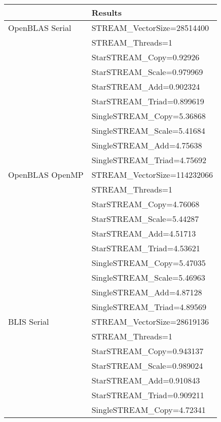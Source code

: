 \begin{table}[H]
\begin{center}
\begin{tabular}{ |l|l| } 
\hline
                & Results \\ 
\hline
OpenBLAS Serial & STREAM\_VectorSize=28514400 \\
                & STREAM\_Threads=1 \\
                & StarSTREAM\_Copy=0.92926 \\
                & StarSTREAM\_Scale=0.979969 \\
                & StarSTREAM\_Add=0.902324 \\
                & StarSTREAM\_Triad=0.899619 \\
                & SingleSTREAM\_Copy=5.36868 \\
                & SingleSTREAM\_Scale=5.41684 \\
                & SingleSTREAM\_Add=4.75638 \\
                & SingleSTREAM\_Triad=4.75692 \\
\hline
OpenBLAS OpenMP & STREAM\_VectorSize=114232066 \\
                & STREAM\_Threads=1 \\
                & StarSTREAM\_Copy=4.76068 \\
                & StarSTREAM\_Scale=5.44287 \\
                & StarSTREAM\_Add=4.51713 \\
                & StarSTREAM\_Triad=4.53621 \\
                & SingleSTREAM\_Copy=5.47035 \\
                & SingleSTREAM\_Scale=5.46963 \\
                & SingleSTREAM\_Add=4.87128 \\
                & SingleSTREAM\_Triad=4.89569 \\
\hline
BLIS Serial     & STREAM\_VectorSize=28619136 \\
                & STREAM\_Threads=1 \\
                & StarSTREAM\_Copy=0.943137 \\
                & StarSTREAM\_Scale=0.989024 \\
                & StarSTREAM\_Add=0.910843 \\
                & StarSTREAM\_Triad=0.909211 \\
                & SingleSTREAM\_Copy=4.72341 \\

\end{tabular}
\end{center}
\end{table}
